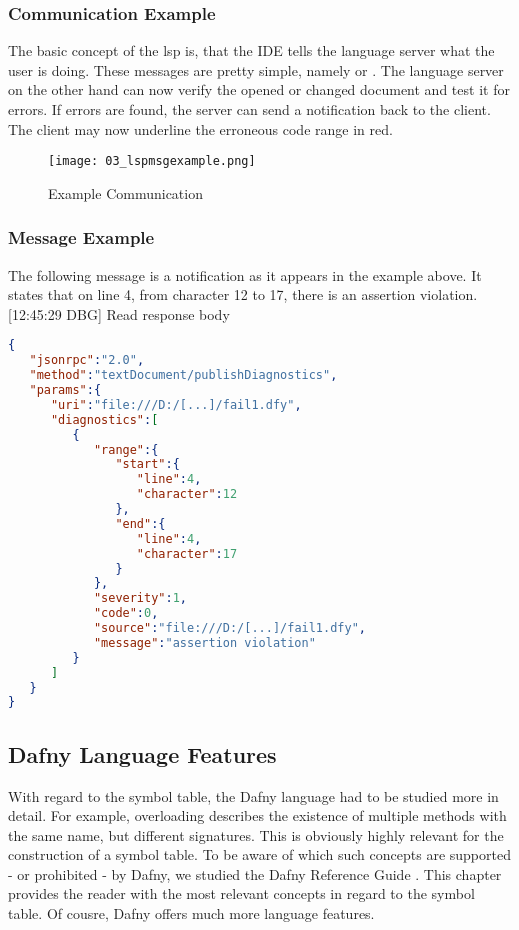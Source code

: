 \subsubsection{Communication Example}
The basic concept of the lsp is, that the IDE tells the language server what the user is doing. These messages are pretty simple, namely  or . The language server on the other hand can now verify the opened or changed document and test it for errors. If errors are found, the server can send a  notification back to the client. The client may now underline the erroneous code range in red. \cite{lspspec}

\begin{figure}[h]
    \centering
    \texttt{[image: 03\_lspmsgexample.png]}
    \caption{Example Communication}
    \label{fig:lspmsgexample}
\end{figure}

\subsubsection{Message Example}
The following message is a  notification as it appears in the example above. It states that on line 4, from character 12 to 17, there is an assertion violation.\\

[12:45:29 DBG] Read response body 
\begin{lstlisting}[language=json, caption={Module Example}, captionpos=b, label={lst:shadowing}]
{ 
   "jsonrpc":"2.0",
   "method":"textDocument/publishDiagnostics",
   "params":{ 
      "uri":"file:///D:/[...]/fail1.dfy",
      "diagnostics":[ 
         { 
            "range":{ 
               "start":{ 
                  "line":4,
                  "character":12
               },
               "end":{ 
                  "line":4,
                  "character":17
               }
            },
            "severity":1,
            "code":0,
            "source":"file:///D:/[...]/fail1.dfy",
            "message":"assertion violation"
         }
      ]
   }
}
\end{lstlisting}






\subsection{Dafny Language Features}
With regard to the symbol table, the Dafny language had to be studied more in detail. For example, overloading describes the existence of multiple methods with the same name, but different signatures. This is obviously highly relevant for the construction of a symbol table.
To be aware of which such concepts are supported - or prohibited - by Dafny, we studied the Dafny Reference Guide \cite{dafnyReferenceManual}. This chapter provides the reader with the most relevant concepts in regard to the symbol table. Of cousre, Dafny offers much more language features.


